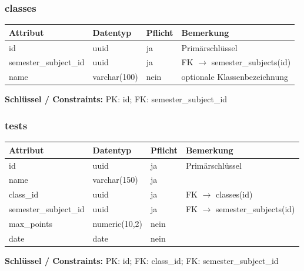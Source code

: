 \documentclass[12pt,a4paper]{article}
\begin{document}
    \subsubsection{classes}
    \begin{longtable}{|L{4cm}|L{3cm}|L{3cm}|L{4cm}|}
        \hline
        \textbf{Attribut} & \textbf{Datentyp} & \textbf{Pflicht} & \textbf{Bemerkung} \\ \hline
        id & uuid & ja & Primärschlüssel \\ \hline
        semester\_subject\_id & uuid & ja & FK $\rightarrow$ semester\_subjects(id) \\ \hline
        name & varchar(100) & nein & optionale Klassenbezeichnung \\ \hline
    \end{longtable}
    \textbf{Schlüssel / Constraints:} PK: id; FK: semester\_subject\_id

    \subsubsection{tests}
    \begin{longtable}{|L{4cm}|L{3cm}|L{3cm}|L{4cm}|}
        \hline
        \textbf{Attribut} & \textbf{Datentyp} & \textbf{Pflicht} & \textbf{Bemerkung} \\ \hline
        id & uuid & ja & Primärschlüssel \\ \hline
        name & varchar(150) & ja &  \\ \hline
        class\_id & uuid & ja & FK $\rightarrow$ classes(id) \\ \hline
        semester\_subject\_id & uuid & ja & FK $\rightarrow$ semester\_subjects(id) \\ \hline
        max\_points & numeric(10,2) & nein &  \\ \hline
        date & date & nein &  \\ \hline
    \end{longtable}
    \textbf{Schlüssel / Constraints:} PK: id; FK: class\_id; FK: semester\_subject\_id
\end{document}
